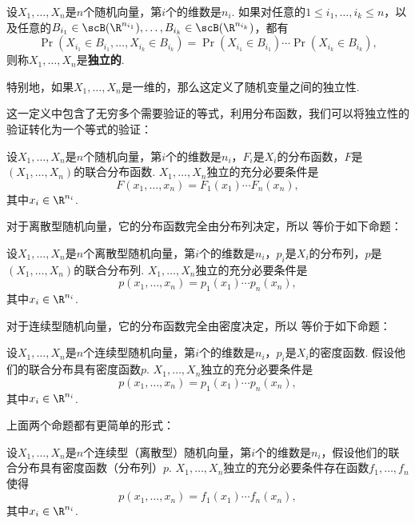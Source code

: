 \begin{definition}[随机向量的独立性]
设$X_1,\dots,X_n$是$n$个随机向量，第$i$个的维数是$n_i$. 如果对任意的$1\leq i_1,\dots,i_k\leq n$，以及任意的$B_{i_1}\in\scB(\R^{n_{i_1}}),\dots,B_{i_k}\in\scB(\R^{n_{i_k}})$，都有
\[\Pr(X_{i_1}\in B_{i_1},\dots,X_{i_k}\in B_{i_k})=\Pr(X_{i_1}\in B_{i_1})\cdots\Pr(X_{i_k}\in B_{i_k}),\]
则称$X_1,\dots,X_n$是\textbf{独立的}. 

特别地，如果$X_1,\dots,X_n$是一维的，那么这定义了随机变量之间的独立性. 
\end{definition}

这一定义中包含了无穷多个需要验证的等式，利用分布函数，我们可以将独立性的验证转化为一个等式的验证：

\begin{theorem}\label{thm:independence}
设$X_1,\dots,X_n$是$n$个随机向量，第$i$个的维数是$n_i$，$F_i$是$X_i$的分布函数，$F$是$(X_1,\dots,X_n)$的联合分布函数. $X_1,\dots,X_n$独立的充分必要条件是
\[F(x_1,\dots,x_n)=F_1(x_1)\cdots F_n(x_n),\]
其中$x_i\in\R^{n_i}$.
\end{theorem}

对于离散型随机向量，它的分布函数完全由分布列决定，所以 等价于如下命题：

\begin{proposition}\label{prop:independence-discrete}
设$X_1,\dots,X_n$是$n$个离散型随机向量，第$i$个的维数是$n_i$，$p_i$是$X_i$的分布列，$p$是$(X_1,\dots,X_n)$的联合分布列. $X_1,\dots,X_n$独立的充分必要条件是
\[p(x_1,\dots,x_n)=p_1(x_1)\cdots p_n(x_n),\]
其中$x_i\in\R^{n_i}$.
\end{proposition}

对于连续型随机向量，它的分布函数完全由密度决定，所以 等价于如下命题：

\begin{proposition}\label{prop:independence-continuous}
设$X_1,\dots,X_n$是$n$个连续型随机向量，第$i$个的维数是$n_i$，$p_i$是$X_i$的密度函数. 假设他们的联合分布具有密度函数$p$. $X_1,\dots,X_n$独立的充分必要条件是
\[p(x_1,\dots,x_n)=p_1(x_1)\cdots p_n(x_n),\]
其中$x_i\in\R^{n_i}$.
\end{proposition}

上面两个命题都有更简单的形式：

\begin{corollary}\label{cor:independence-continuous}
设$X_1,\dots,X_n$是$n$个连续型（离散型）随机向量，第$i$个的维数是$n_i$，假设他们的联合分布具有密度函数（分布列）$p$. $X_1,\dots,X_n$独立的充分必要条件存在函数$f_1,\dots,f_n$使得
\[p(x_1,\dots,x_n)=f_1(x_1)\cdots f_n(x_n),\]
其中$x_i\in\R^{n_i}$.
\end{corollary}

